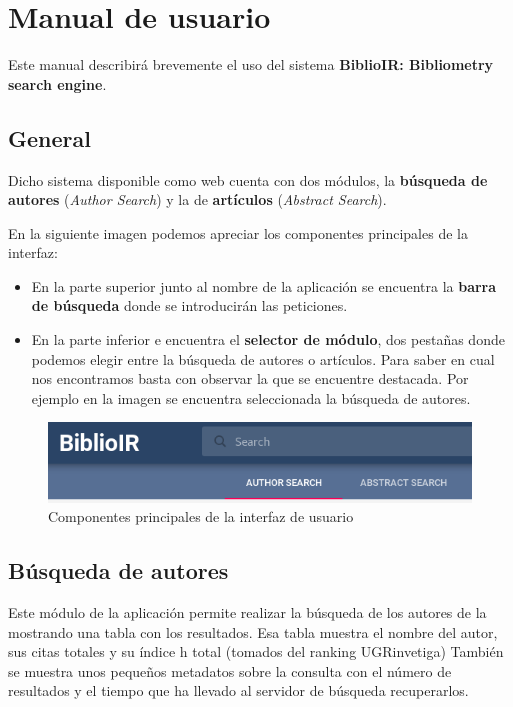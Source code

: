 \chapter{Manual de usuario}
Este manual describirá brevemente el uso del sistema \textbf{BiblioIR: Bibliometry search engine}.

\section{General}
Dicho sistema disponible como web cuenta con dos módulos, la \textbf{búsqueda de autores }(\textit{Author Search}) y la de \textbf{artículos} (\textit{Abstract Search}).

En la siguiente imagen podemos apreciar los componentes principales de la interfaz:
\begin{itemize}
	\item En la parte superior junto al nombre de la aplicación se encuentra la \textbf{barra de búsqueda} donde se introducirán las peticiones.
	\item En la parte inferior e encuentra el \textbf{selector de módulo}, dos pestañas donde podemos elegir entre la búsqueda de autores o artículos. Para saber en cual nos encontramos basta con observar la que se encuentre destacada. Por ejemplo en la imagen se encuentra seleccionada la búsqueda de autores.
\end{itemize}

\begin{figure}[h]
	
	\centering
	\includegraphics[width=\linewidth]{imagenes/UIcompPrinc}
	\caption{Componentes principales de la interfaz de usuario}
\end{figure}

\section{Búsqueda de autores}
Este módulo de la aplicación permite realizar la búsqueda de los autores de la \myFacultyShort mostrando una tabla con los resultados. Esa tabla muestra el nombre del autor, sus citas totales y su índice h total (tomados del ranking UGRinvetiga) También se muestra unos pequeños metadatos sobre la consulta con el número de resultados y el tiempo que ha llevado al servidor de búsqueda recuperarlos.

